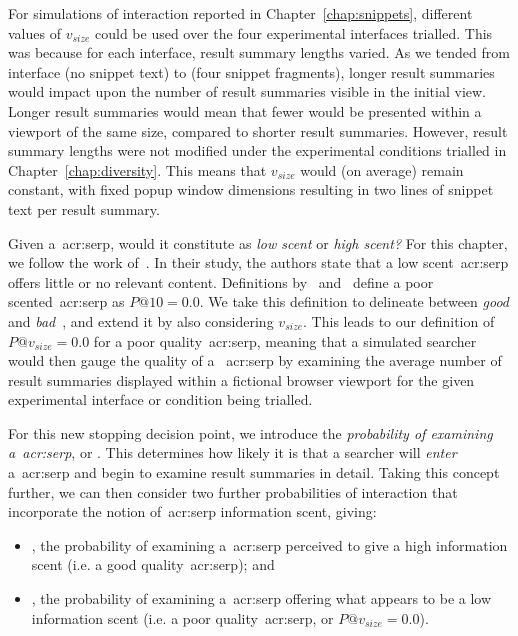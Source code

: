 For simulations of interaction reported in Chapter~\ref{chap:snippets}, different values of $v_{size}$ could be used over the four experimental interfaces trialled. This was because for each interface, result summary lengths varied. As we tended from interface  (no snippet text) to  (four snippet fragments), longer result summaries would impact upon the number of result summaries visible in the initial view. Longer result summaries would mean that fewer would be presented within a viewport of the same size, compared to shorter result summaries. However, result summary lengths were not modified under the experimental conditions trialled in Chapter~\ref{chap:diversity}. This means that $v_{size}$ would (on average) remain constant, with fixed popup window dimensions resulting in two lines of snippet text per result summary.

 Given a~\gls{acr:serp}, would it constitute as \emph{low scent} or \emph{high scent?} For this chapter, we follow the work of~\cite{wu2014information_scent}. In their study, the authors state that a low scent~\gls{acr:serp} offers little or no relevant content. Definitions by~\cite{wu2014information_scent} and~\cite{hassan2013serp_abandonment} define a poor scented~\gls{acr:serp} as $P@10=0.0$. We take this definition to delineate between \emph{good} and \emph{bad}~, and extend it by also considering $v_{size}$. This leads to our definition of $P@v_{size}=0.0$ for a poor quality~\gls{acr:serp}, meaning that a simulated searcher would then gauge the quality of a ~\gls{acr:serp} by examining the average number of result summaries displayed within a fictional browser viewport for the given experimental interface or condition being trialled.

 For this new stopping decision point, we introduce the \emph{probability of examining a~\gls{acr:serp}}, or . This determines how likely it is that a searcher will \emph{enter} a~\gls{acr:serp} and begin to examine result summaries in detail. Taking this concept further, we can then consider two further probabilities of interaction that incorporate the notion of~\gls{acr:serp} information scent, giving:

\begin{itemize}
    \item{, the probability of examining a~\gls{acr:serp} perceived to give a high information scent (i.e. a good quality~\gls{acr:serp}); and}
    \item{, the probability of examining a~\gls{acr:serp} offering what appears to be a low information scent (i.e. a poor quality~\gls{acr:serp}, or $P@v_{size}=0.0$).}
\end{itemize}

